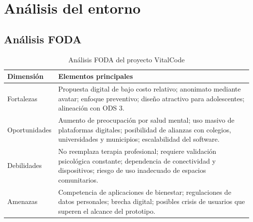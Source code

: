 \documentclass[12pt,letterpaper]{article}
\begin{document}
\section{Análisis del entorno}

\subsection{Análisis FODA}
\begin{table}[H]
\centering
\caption{Análisis FODA del proyecto VitalCode}
\begin{tabularx}{\textwidth}{p{3cm} X}
\toprule
\textbf{Dimensión} & \textbf{Elementos principales} \\
\midrule
Fortalezas & Propuesta digital de bajo costo relativo; anonimato mediante avatar; enfoque preventivo; diseño atractivo para adolescentes; alineación con ODS 3. \\
Oportunidades & Aumento de preocupación por salud mental; uso masivo de plataformas digitales; posibilidad de alianzas con colegios, universidades y municipios; escalabilidad del software. \\
Debilidades & No reemplaza terapia profesional; requiere validación psicológica constante; dependencia de conectividad y dispositivos; riesgo de uso inadecuado de espacios comunitarios. \\
Amenazas & Competencia de aplicaciones de bienestar; regulaciones de datos personales; brecha digital; posibles crisis de usuarios que superen el alcance del prototipo. \\
\bottomrule
\end{tabularx}
\end{table}
\end{document}
